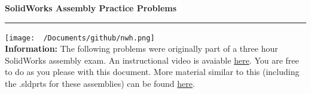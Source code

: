 \documentclass{article}
\begin{document}
\pagecolor{noah}
\center
\Huge{\textbf{SolidWorks Assembly Practice Problems}\\[3mm] \hrule
\vspace{4mm}
\texttt{[image: ~/Documents/github/nwh.png]}\\[4mm] 
\justify\normalsize
\textbf{Information:} The following problems were originally part of a three hour SolidWorks assembly exam. An instructional video is avaiable \href{https://www.youtube.com/watch?v=o4F9eGQ8W1k&list=PL_ks8ETHwZM17sjwTXLjIJNA6Z_pSvy5g&index=4&t=3s}{here}. You are free to do as you please with this document. More material similar to this (including the .sldprts for these assemblies) can be found \href{https://github.com/noahhaworth/CAD_Material}{here}.\\[10mm]
\newpage
{}

}
\end{document}
